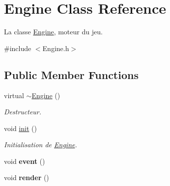 \hypertarget{classEngine}{\section{Engine Class Reference}
\label{classEngine}
}


La classe \hyperlink{classEngine}{Engine}, moteur du jeu.  




{\ttfamily \#include $<$Engine.\-h$>$}

\subsection*{Public Member Functions}
\begin{DoxyCompactItemize}
\item 
virtual \hyperlink{classEngine_a41f2d854040e17d9c4d7b324a4bfbf39}{$\sim$\-Engine} ()
\begin{DoxyCompactList}\small\item\em Destructeur. \end{DoxyCompactList}\item 
void \hyperlink{classEngine_ab44d76e2ff6057e73d6210cf9af0d89e}{init} ()
\begin{DoxyCompactList}\small\item\em Initialisation de \hyperlink{classEngine}{Engine}. \end{DoxyCompactList}\item 
\hypertarget{classEngine_af81ae123a517a8d15cff3c6a091d5050}{void {\bfseries event} ()}\label{classEngine_af81ae123a517a8d15cff3c6a091d5050}

\item 
\hypertarget{classEngine_a7960743aefd62e846e7f3cd92c18bc73}{void {\bfseries render} ()}\label{classEngine_a7960743aefd62e846e7f3cd92c18bc73}


\end{DoxyCompactItemize}
